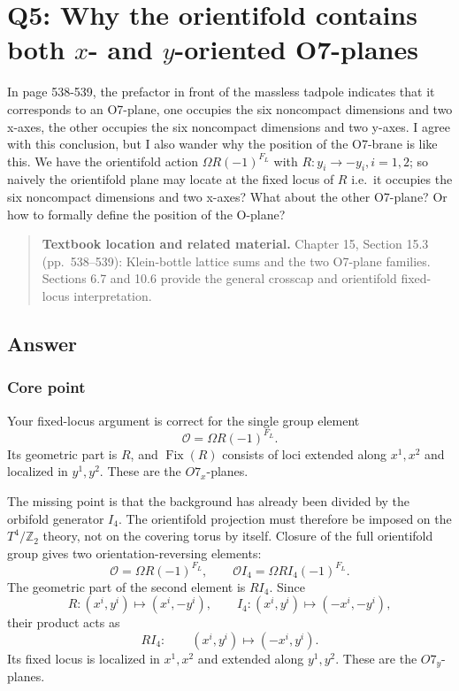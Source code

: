\documentclass[
  10pt,
  a4paper,
  openany]{book}
\begin{document}
\section{\texorpdfstring{Q5: Why the orientifold contains both \(x\)-
and \(y\)-oriented
O7-planes}{Q5: Why the orientifold contains both x- and y-oriented O7-planes}}\label{q5-why-the-orientifold-contains-both-x--and-y-oriented-o7-planes}

In page 538-539, the prefactor in front of the massless tadpole
indicates that it corresponds to an O7-plane, one occupies the six
noncompact dimensions and two x-axes, the other occupies the six
noncompact dimensions and two y-axes. I agree with this conclusion, but
I also wander why the position of the O7-brane is like this. We have the
orientifold action \(\Omega R(-1)^{F_{L}}\) with
\(R:y_{i}\to-y_{i},i=1,2\); so naively the orientifold plane may locate
at the fixed locus of \(R\) i.e.~it occupies the six noncompact
dimensions and two x-axes? What about the other O7-plane? Or how to
formally define the position of the O-plane?

\begin{quote}
\textbf{Textbook location and related material.} Chapter 15, Section
15.3 (pp.~538--539): Klein-bottle lattice sums and the two O7-plane
families. Sections 6.7 and 10.6 provide the general crosscap and
orientifold fixed-locus interpretation.
\end{quote}

\subsection{Answer}\label{answer-25}

\subsubsection{Core point}\label{core-point-25}

Your fixed-locus argument is correct for the single group element \[
\mathcal O=\Omega R(-1)^{F_L}.
\] Its geometric part is \(R\), and \(\operatorname{Fix}(R)\) consists
of loci extended along \(x^1,x^2\) and localized in \(y^1,y^2\). These
are the \(O7_x\)-planes.

The missing point is that the background has already been divided by the
orbifold generator \(I_4\). The orientifold projection must therefore be
imposed on the \(T^4/\mathbb Z_2\) theory, not on the covering torus by
itself. Closure of the full orientifold group gives two
orientation-reversing elements: \[
\mathcal O
=
\Omega R(-1)^{F_L},
\qquad
\mathcal O I_4
=
\Omega RI_4(-1)^{F_L}.
\] The geometric part of the second element is \(RI_4\). Since \[
R:(x^i,y^i)\mapsto(x^i,-y^i),
\qquad
I_4:(x^i,y^i)\mapsto(-x^i,-y^i),
\] their product acts as \[
RI_4:
\qquad
(x^i,y^i)\mapsto(-x^i,y^i).
\] Its fixed locus is localized in \(x^1,x^2\) and extended along
\(y^1,y^2\). These are the \(O7_y\)-planes.
\end{document}
